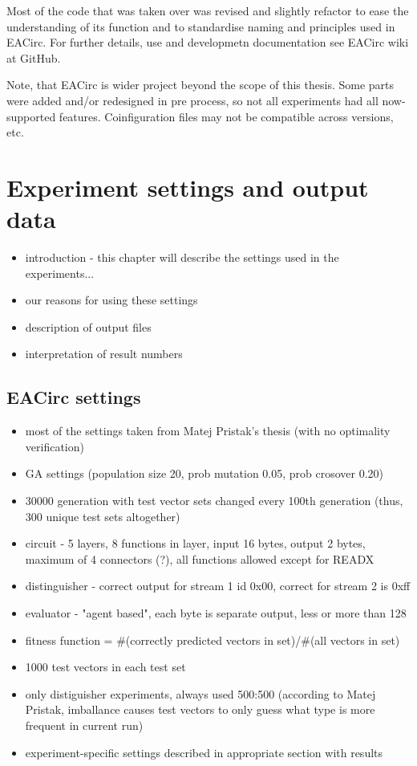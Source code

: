 \documentclass[12pt,oneside]{fithesis2}
\begin{document}
Most of the code that was taken over was revised and slightly refactor to ease the understanding of its function and to standardise naming and principles used in EACirc. For further details, use and developmetn documentation see EACirc wiki at GitHub.

Note, that EACirc is wider project beyond the scope of this thesis. Some parts were added and/or redesigned in pre process, so not all experiments had all now-supported features. Coinfiguration files may not be compatible across versions, etc.

\chapter{Experiment settings and output data}
\label{chap:settings}

\begin{itemize}
\item introduction - this chapter will describe the settings used in the experiments...
\item our reasons for using these settings
\item description of output files
\item interpretation of result numbers
\end{itemize}

\section{EACirc settings}
\label{sec:settings-eacirc}

\begin{itemize}
\item most of the settings taken from Matej Pristak's thesis (with no optimality verification)
\item GA settings (population size 20, prob mutation 0.05, prob crosover 0.20)
\item 30000 generation with test vector sets changed every 100th generation (thus, 300 unique test sets altogether)
\item circuit - 5 layers, 8 functions in layer, input 16 bytes, output 2 bytes, maximum of 4 connectors (?), all functions allowed except for READX
\item distinguisher - correct output for stream 1 id 0x00, correct for stream 2 is 0xff
\item evaluator - "agent based", each byte is separate output, less or more than 128
\item fitness function = \#(correctly predicted vectors in set)/\#(all vectors in set)
\item 1000 test vectors in each test set
\item only distiguisher experiments, always used 500:500 (according to Matej Pristak, imballance causes test vectors to only guess what type is more frequent in current run)
\item experiment-specific settings described in appropriate section with results
\end{itemize}
\end{document}
